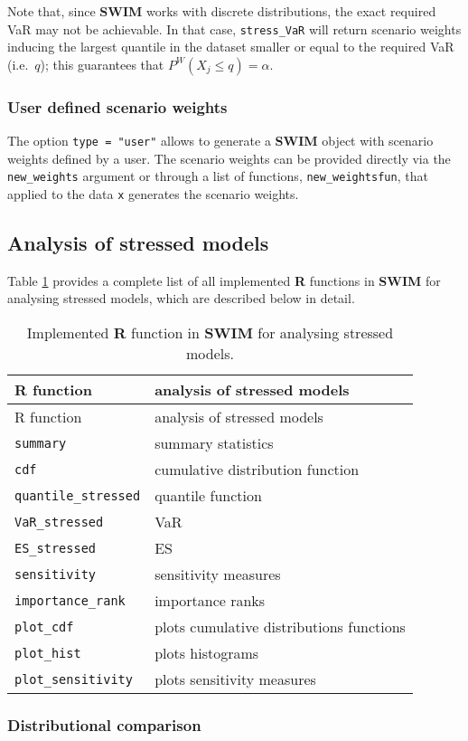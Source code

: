 \documentclass[
]{article}
\begin{document}
Note that, since \textbf{SWIM} works with discrete distributions, the exact required VaR may not be achievable. In that case, \texttt{stress\_VaR} will return scenario weights inducing the largest quantile in the dataset smaller or equal to the required VaR (i.e.~\(q\)); this guarantees that \(P^W(X_j\leq q)=\alpha\).

\hypertarget{Sec:User}{%
\subsubsection{User defined scenario weights}\label{Sec:User}}

The option \texttt{type\ =\ "user"} allows to generate a \textbf{SWIM} object with scenario weights defined by a user. The scenario weights can be provided directly via the \texttt{new\_weights} argument or through a list of functions, \texttt{new\_weightsfun}, that applied to the data \texttt{x} generates the scenario weights.

\hypertarget{Sec:analysis}{%
\subsection{Analysis of stressed models}\label{Sec:analysis}}

Table \ref{tab:Ranalysis} provides a complete list of all implemented \textbf{R} functions in \textbf{SWIM} for analysing stressed models, which are described below in detail.

\begin{longtable}[]{@{}ll@{}}
\caption{\label{tab:Ranalysis} Implemented \textbf{R} function in \textbf{SWIM} for analysing stressed models.}\tabularnewline
\toprule
R function & analysis of stressed models\tabularnewline
\midrule
\endfirsthead
\toprule
R function & analysis of stressed models\tabularnewline
\midrule
\endhead
\texttt{summary} & summary statistics\tabularnewline
\texttt{cdf} & cumulative distribution function\tabularnewline
\texttt{quantile\_stressed} & quantile function\tabularnewline
\texttt{VaR\_stressed} & VaR\tabularnewline
\texttt{ES\_stressed} & ES\tabularnewline
\texttt{sensitivity} & sensitivity measures\tabularnewline
\texttt{importance\_rank} & importance ranks\tabularnewline
\texttt{plot\_cdf} & plots cumulative distributions functions\tabularnewline
\texttt{plot\_hist} & plots histograms\tabularnewline
\texttt{plot\_sensitivity} & plots sensitivity measures\tabularnewline
\bottomrule
\end{longtable}

\hypertarget{distributional-comparison}{%
\subsubsection{Distributional comparison}\label{distributional-comparison}}
\end{document}
